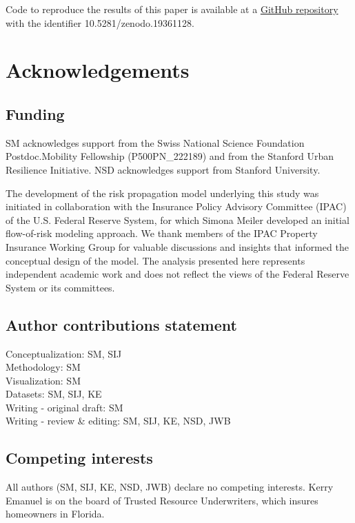 \documentclass[fleqn,10pt]{wlscirep}
\begin{document}
Code to reproduce the results of this paper is available at a \href{https://github.com/simonameiler/systemic_insurance_risk_fl_pub/}{GitHub repository} \cite{meiler_systemic-risk_github_2026} with the identifier 10.5281/zenodo.19361128.



\section*{Acknowledgements}
\subsection*{Funding}
SM acknowledges support from the Swiss National Science Foundation Postdoc.Mobility Fellowship (P500PN\_222189) and from the Stanford Urban Resilience Initiative. NSD acknowledges support from Stanford University. \medskip

The development of the risk propagation model underlying this study was initiated in collaboration with the Insurance Policy Advisory Committee (IPAC) of the U.S. Federal Reserve System, for which Simona Meiler developed an initial flow-of-risk modeling approach. We thank members of the IPAC Property Insurance Working Group for valuable discussions and insights that informed the conceptual design of the model. The analysis presented here represents independent academic work and does not reflect the views of the Federal Reserve System or its committees.

\subsection*{Author contributions statement}
Conceptualization: SM, SIJ\\
Methodology: SM\\
Visualization: SM\\
Datasets: SM, SIJ, KE\\
Writing - original draft: SM\\
Writing - review \& editing: SM, SIJ, KE, NSD, JWB\medskip

\subsection*{Competing interests}
All authors (SM, SIJ, KE, NSD, JWB) declare no competing interests.
Kerry Emanuel is on the board of Trusted Resource Underwriters, which insures homeowners in Florida.
\end{document}
